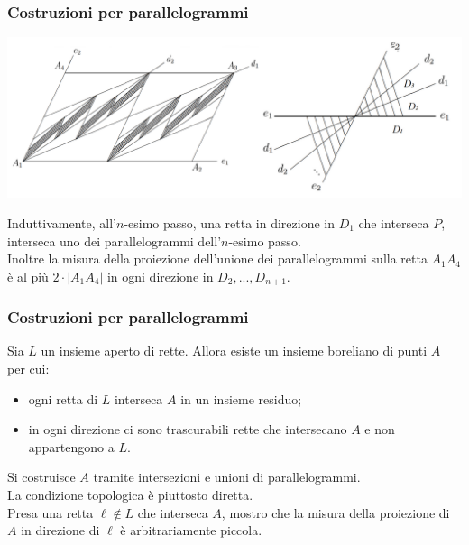 \documentclass[11pt]{beamer} %
\newcommand{\<}{\langle}
\renewcommand{\>}{\rangle}
\theoremstyle{theorem}
\theoremstyle{theorem}
\theoremstyle{theorem}
\theoremstyle{theorem}
\theoremstyle{theorem}
\begin{document}
\begin{frame}[fragile]
	\frametitle{Costruzioni per parallelogrammi}
	
	\begin{center}
	\includegraphics[width=0.9\columnwidth]{prova2.png}
	\end{center}

	Induttivamente, all'$n$-esimo passo, una retta in direzione in $D_1$ che interseca $P$, interseca uno dei parallelogrammi dell'$n$-esimo passo.\\
	Inoltre la misura della proiezione dell'unione dei parallelogrammi 
	sulla retta $A_{1} A_{4}$ è al più $2 \cdot\left|A_{1} A_{4}\right|$ in ogni direzione in $D_2,...,D_{n+1}$.\\

\end{frame}



\begin{frame}
	\frametitle{Costruzioni per parallelogrammi}
	\begin{lemma}[2]
		Sia $L$ un insieme aperto di rette. Allora esiste un insieme boreliano di punti $A$ per cui:\\
		\begin{itemize}
			\item ogni retta di $L$ interseca $A$ in un insieme residuo;\\
			\item in ogni direzione ci sono trascurabili rette che intersecano $A$ e non appartengono a $L$.\\
		\end{itemize}
	\end{lemma}
	
	\pause
	Si costruisce $A$ tramite intersezioni e unioni di parallelogrammi.\\ \pause
	La condizione topologica è piuttosto diretta.\\ \pause
	Presa una retta $\ell \not \in L$ che interseca $A$, mostro che la misura della proiezione di $A$ in direzione di $\ell$ è arbitrariamente piccola.
	
	
\end{frame}	
\end{document}
